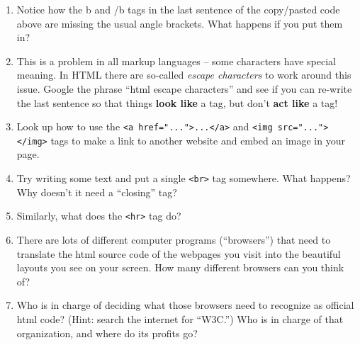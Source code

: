 \begin{enumerate}
\item Notice how the b and /b tags in the last sentence of the copy/pasted code above are missing the usual angle brackets.  What happens if you put them in?
\item This is a problem in all markup languages -- some characters have special meaning.  In HTML there are so-called {\em escape characters} to work around this issue.  Google the phrase ``html escape characters'' and see if you can re-write the last sentence so that things {\bf look like} a tag, but don't {\bf act like} a tag!
\item Look up how to use the \texttt{<a href="...">...</a>} and \texttt{<img src="..."></img>} tags to make a link to another website and embed an image in your page.
\item Try writing some text and put a single \texttt{<br>} tag somewhere. What happens? Why doesn't it need a ``closing'' tag?
\item Similarly, what does the \texttt{<hr>} tag do?
\item There are lots of different computer programs (``browsers'') that need to translate the html source code of the webpages you visit into the beautiful layouts you see on your screen. How many different browsers can you think of?
\item Who is in charge of deciding what those browsers need to recognize as official html code? (Hint: search the internet for ``W3C.'') Who is in charge of that organization, and where do its profits go?
\end{enumerate}